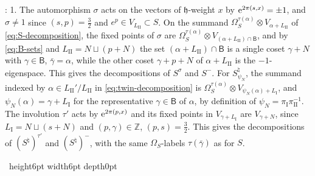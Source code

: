 \documentclass[leqno]{article}
\newcommand{\Z}{\ensuremath{\mathbb{Z}}}
\newcommand{\qed}{\hfill \vrule height6pt  width6pt depth0pt}
\newcommand{\ot}{\otimes}
\let\i\relax
\newcommand{\i}{\mathrm{i}}
\newcommand{\e}{\mathrm{e}}
\newenvironment{proof}[1][]{\noindent {\it Proof #1} : }{\hbox{~}\qed
\smallskip
}
\numberwithin{equation}{section}
\begin{document}
\begin{proof}
1. The automorphism $\sigma$ acts on the vectors of $\mathfrak h$-weight $x$ by $\e^{2\pi\i(s,x)} = \pm1$, and $\sigma \neq 1$ since $(s,p) = \frac32$ and $e^p \in V_{L_{\mathrm{II}}} \subset S$. On the summand $\Omega_S^{\tau(\alpha)} \ot V_{\alpha+L_{\mathrm{II}}}$ of \eqref{eq:S-decomposition}, the fixed points of $\sigma$ are $\Omega_S^{\tau(\alpha)} \ot V_{(\alpha+L_{\mathrm{II}}) \cap \mathsf B}$, and by \eqref{eq:B-sets} and $L_{\mathrm{II}} = N \sqcup (p+N)$ the set $(\alpha+L_{\mathrm{II}}) \cap \mathsf B$ is a single coset $\gamma+N$ with $\gamma \in \mathsf B$, $\bar\gamma = \alpha$, while the other coset $\gamma+p+N$ of $\alpha+L_{\mathrm{II}}$ is the $-1$-eigenspace. This gives the decompositions of $S^\sigma$ and $S^-$. For $S^\natural_{\psi_N}$, the summand indexed by $\alpha \in L_{\mathrm{II}}'/L_{\mathrm{II}}$ in \eqref{eq:twin-decomposition} is $\Omega_S^{\tau(\alpha)} \ot V_{\psi_N(\alpha)+L_{\mathrm I}}$, and $\psi_N(\alpha) = \gamma+L_{\mathrm I}$ for the representative $\gamma \in \mathsf B$ of $\alpha$, by definition of $\psi_N = \pi_{\mathrm I}\pi_{\mathrm{II}}^{-1}$. The involution $\tau'$ acts by $\e^{2\pi\i(p,x)}$ and its fixed points in $V_{\gamma+L_{\mathrm I}}$ are $V_{\gamma+N}$, since $L_{\mathrm I} = N \sqcup (s+N)$ and $(p,\gamma) \in \Z$, $(p,s) = \frac32$. This gives the decompositions of $(S^\natural)^{\tau'}$ and $(S^\natural)^-$, with the same $\Omega_S$-labels $\tau(\bar\gamma)$ as for $S$.


\end{proof}
\end{document}
